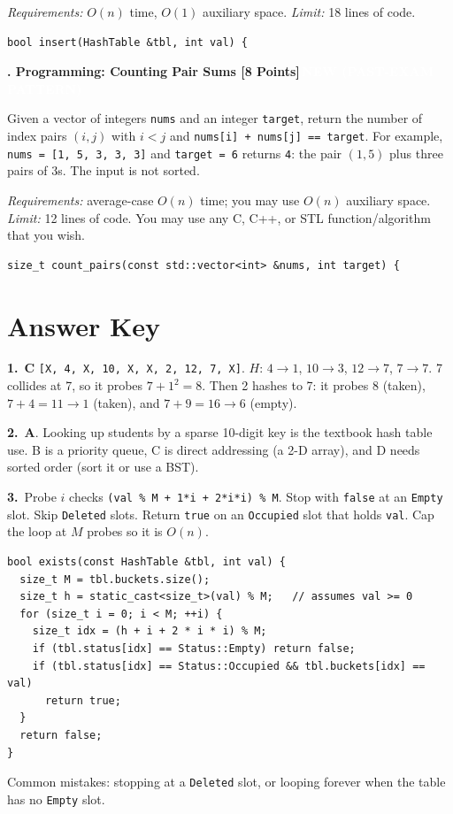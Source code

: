 \documentclass[11pt]{article}
\newcommand{\newtag}{\colorbox{newc}{\textcolor{white}{\scriptsize\textbf{\,NEW (PAST-EXAM PATTERN)\,}}}}
\newcounter{q}
\newcommand{\question}[2]{\vspace{8pt}\refstepcounter{q}\textbf{\arabic{q}. #1}\hfill #2\par}
\newcommand{\answer}[1]{\par\vspace{6pt}\textbf{#1.}~}
\begin{document}
\textit{Requirements:} $O(n)$ time, $O(1)$ auxiliary space. \textit{Limit:} 18 lines of code.
\begin{lstlisting}[numbers=none]
bool insert(HashTable &tbl, int val) {
\end{lstlisting}

\question{Programming: Counting Pair Sums [8 Points]}{\newtag}
Given a vector of integers \texttt{nums} and an integer \texttt{target}, return the number of index pairs $(i, j)$ with
$i < j$ and \texttt{nums[i] + nums[j] == target}. For example, \texttt{nums = [1, 5, 3, 3, 3]} and \texttt{target = 6} returns
\texttt{4}: the pair $(1, 5)$ plus three pairs of 3s. The input is not sorted.

\textit{Requirements:} average-case $O(n)$ time; you may use $O(n)$ auxiliary space. \textit{Limit:} 12 lines of code.
You may use any C, C++, or STL function/algorithm that you wish.
\begin{lstlisting}[numbers=none]
size_t count_pairs(const std::vector<int> &nums, int target) {
\end{lstlisting}

\newpage
\section*{Answer Key}

\answer{1}\textbf{C} \texttt{[X, 4, X, 10, X, X, 2, 12, 7, X]}.
$H$: $4\to1$, $10\to3$, $12\to7$, $7\to7$. 7 collides at 7, so it probes $7+1^2 = 8$. Then 2 hashes to 7: it probes 8 (taken),
$7+4 = 11 \to 1$ (taken), and $7+9 = 16 \to 6$ (empty).


\answer{2}\textbf{A}. Looking up students by a sparse 10-digit key is the textbook hash table use.
B is a priority queue, C is direct addressing (a 2-D array), and D needs sorted order (sort it or use a BST).


\answer{3}Probe $i$ checks \texttt{(val \% M + 1*i + 2*i*i) \% M}. Stop with \texttt{false} at an \texttt{Empty} slot. Skip
\texttt{Deleted} slots. Return \texttt{true} on an \texttt{Occupied} slot that holds \texttt{val}. Cap the loop at $M$ probes so it is $O(n)$.
\begin{lstlisting}
bool exists(const HashTable &tbl, int val) {
  size_t M = tbl.buckets.size();
  size_t h = static_cast<size_t>(val) % M;   // assumes val >= 0
  for (size_t i = 0; i < M; ++i) {
    size_t idx = (h + i + 2 * i * i) % M;
    if (tbl.status[idx] == Status::Empty) return false;
    if (tbl.status[idx] == Status::Occupied && tbl.buckets[idx] == val)
      return true;
  }
  return false;
}
\end{lstlisting}
Common mistakes: stopping at a \texttt{Deleted} slot, or looping forever when the table has no \texttt{Empty} slot.
\end{document}

